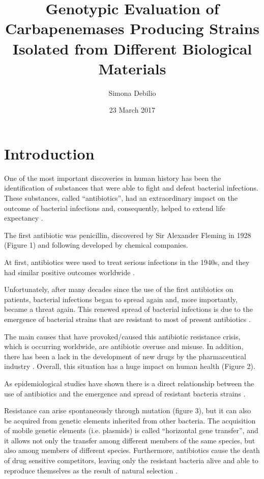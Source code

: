 \documentclass[11pt]{report}
\title{\textbf{Genotypic Evaluation of Carbapenemases Producing Strains Isolated from Different Biological Materials}}
\author{Simona Debilio}
\date{23 March 2017}
\begin{document}
\maketitle

\tableofcontents

\chapter{Introduction}
One of the most important discoveries in human history has been the identification of substances that were able to fight and defeat bacterial infections.
These substances, called “antibiotics”, had an extraordinary impact on the outcome of bacterial infections and, consequently, helped to extend life expectancy \cite{ventola2015antibiotic}.

The first antibiotic was penicillin, discovered by Sir Alexander Fleming in 1928 (Figure 1) and following developed by chemical companies.

At first, antibiotics were used to treat serious infections in the 1940s, and they had similar positive outcomes worldwide \cite{Spellberg2014}.

Unfortunately, after many decades since the use of the first antibiotics on patients, bacterial infections began to spread again and, more importantly, became a threat again.
This renewed spread of bacterial infections is due to the emergence of bacterial strains that are resistant to most of present antibiotics \cite{ventola2015antibiotic}.

The main causes that have provoked/caused this antibiotic resistance crisis, which is occurring worldwide, are antibiotic overuse and misuse.
In addition, there has been a lack in the development of new drugs by the pharmaceutical industry \cite{nature2013}.
Overall, this situation has a huge impact on human health (Figure 2).

As epidemiological studies have shown there is a direct relationship between the use of antibiotics and the emergence and spread of resistant bacteria strains \cite{huttner2013antimicrobial}.

Resistance can arise spontaneously through mutation (figure 3), but it can also be acquired from genetic elements inherited from other bacteria.
The acquisition of mobile genetic elements (i.e. plasmids) is called “horizontal gene transfer”, and it allows not only the transfer among different members of the same species, but also among members of different species.
Furthermore, antibiotics cause the death of drug sensitive competitors, leaving only the resistant bacteria alive and able to reproduce themselves as the result of natural selection \cite{doi:10.1093/emph/eou024}.
\end{document}
